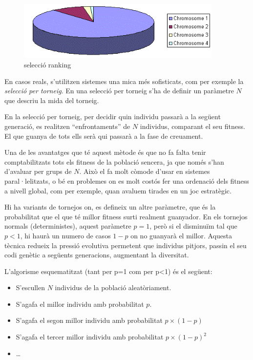 \begin{figure} \centering \includegraphics[width=4in]{intro/rank1.png}
\caption{\label{fig:rank1}selecció ranking}
\end{figure}

En casos reals, s'utilitzen sistemes una mica més sofisticats, com per exemple
la \emph{selecció per torneig}.  En una selecció per torneig s'ha de definir
un paràmetre $N$ que descriu la mida del torneig.

En la selecció per torneig, per decidir quin individu passarà a la següent
generació, es realitzen ``enfrontaments'' de $N$ individus, comparant el seu
fitness.  El que guanya de tots ells serà qui passarà a la fase de creuament.

Una de les avantatges que té aquest mètode és que no fa falta tenir
comptabilitzats tots els fitness de la població sencera, ja que només s'han
d'avaluar per grups de $N$.  Això el fa molt còmode d'usar en sistemes
paral·lelitzats, o bé en problemes on es molt costós fer una ordenació dels
fitness a nivell global, com per exemple, quan avaluem tirades en un joc
estratègic.

Hi ha variants de tornejos on, es defineix un altre paràmetre, que és la
probabilitat que el que té millor fitness surti realment guanyador.  En els
tornejos normals (deterministes), aquest paràmetre $p=1$, però si el disminuïm
tal que $p<1$, hi haurà un numero de casos $1-p$ on no guanyarà el millor.
Aquesta tècnica redueix la pressió evolutiva permetent que individus pitjors,
passin el seu codi genètic a següents generacions, augmentant la diversitat.

L'algorisme esquematitzat (tant per p=1 com per p<1) és el següent:

\begin{itemize}
	\item S'escullen $N$ individus de la població aleatòriament.
	\item S'agafa el millor individu amb probabilitat $p$.
	\item S'agafa el segon millor individu amb probabilitat $p \times (1-p)$
	\item S'agafa el tercer millor individu amb probabilitat $p \times (1-p)^2$
	\item \ldots
\end{itemize}


